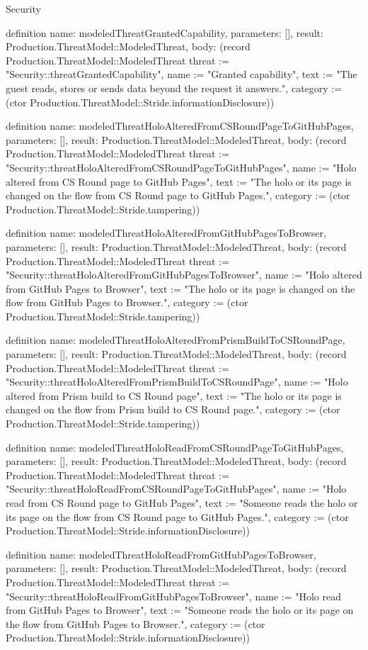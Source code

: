 \begin{lexlean}{Security}
\begin{semanticmodule}
definition{
  name: modeledThreatGrantedCapability,
  parameters: [],
  result: Production.ThreatModel::ModeledThreat,
  body: (record Production.ThreatModel::ModeledThreat {threat := "Security::threatGrantedCapability", name := "Granted capability", text := "The guest reads, stores or sends data beyond the request it answers.", category := (ctor Production.ThreatModel::Stride.informationDisclosure)})
}

definition{
  name: modeledThreatHoloAlteredFromCSRoundPageToGitHubPages,
  parameters: [],
  result: Production.ThreatModel::ModeledThreat,
  body: (record Production.ThreatModel::ModeledThreat {threat := "Security::threatHoloAlteredFromCSRoundPageToGitHubPages", name := "Holo altered from CS Round page to GitHub Pages", text := "The holo or its page is changed on the flow from CS Round page to GitHub Pages.", category := (ctor Production.ThreatModel::Stride.tampering)})
}

definition{
  name: modeledThreatHoloAlteredFromGitHubPagesToBrowser,
  parameters: [],
  result: Production.ThreatModel::ModeledThreat,
  body: (record Production.ThreatModel::ModeledThreat {threat := "Security::threatHoloAlteredFromGitHubPagesToBrowser", name := "Holo altered from GitHub Pages to Browser", text := "The holo or its page is changed on the flow from GitHub Pages to Browser.", category := (ctor Production.ThreatModel::Stride.tampering)})
}

definition{
  name: modeledThreatHoloAlteredFromPrismBuildToCSRoundPage,
  parameters: [],
  result: Production.ThreatModel::ModeledThreat,
  body: (record Production.ThreatModel::ModeledThreat {threat := "Security::threatHoloAlteredFromPrismBuildToCSRoundPage", name := "Holo altered from Prism build to CS Round page", text := "The holo or its page is changed on the flow from Prism build to CS Round page.", category := (ctor Production.ThreatModel::Stride.tampering)})
}

definition{
  name: modeledThreatHoloReadFromCSRoundPageToGitHubPages,
  parameters: [],
  result: Production.ThreatModel::ModeledThreat,
  body: (record Production.ThreatModel::ModeledThreat {threat := "Security::threatHoloReadFromCSRoundPageToGitHubPages", name := "Holo read from CS Round page to GitHub Pages", text := "Someone reads the holo or its page on the flow from CS Round page to GitHub Pages.", category := (ctor Production.ThreatModel::Stride.informationDisclosure)})
}

definition{
  name: modeledThreatHoloReadFromGitHubPagesToBrowser,
  parameters: [],
  result: Production.ThreatModel::ModeledThreat,
  body: (record Production.ThreatModel::ModeledThreat {threat := "Security::threatHoloReadFromGitHubPagesToBrowser", name := "Holo read from GitHub Pages to Browser", text := "Someone reads the holo or its page on the flow from GitHub Pages to Browser.", category := (ctor Production.ThreatModel::Stride.informationDisclosure)})
}


\end{semanticmodule}
\end{lexlean}
